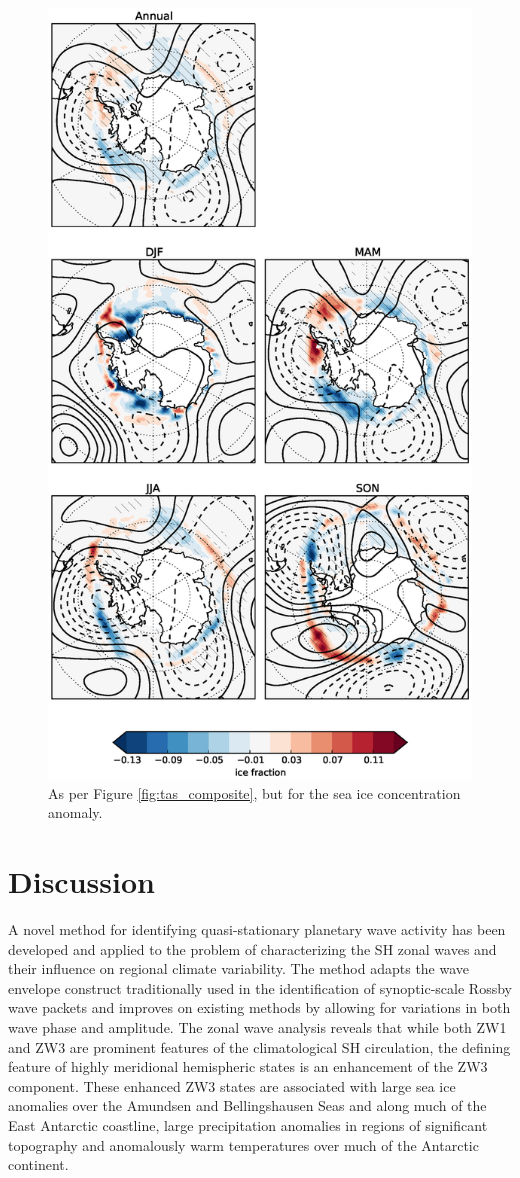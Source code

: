 \begin{figure}
\begin{center}
\includegraphics[width=0.63\columnwidth]{figures/zonalwaves/sic-composite_pwigt90pct_ERAInterim_500hPa_030day-runmean-anom-wrt-all_native-shextropics15.eps}
\caption{\label{fig:sic_composite}
As per Figure \ref{fig:tas_composite}, but for the sea ice concentration anomaly.}
\end{center}
\end{figure} 
 

\section{Discussion}


A novel method for identifying quasi-stationary planetary wave activity has been developed and applied to the problem of characterizing the SH zonal waves and their influence on regional climate variability. The method adapts the wave envelope construct traditionally used in the identification of synoptic-scale Rossby wave packets and improves on existing methods by allowing for variations in both wave phase and amplitude. The zonal wave analysis reveals that while both ZW1 and ZW3 are prominent features of the climatological SH circulation, the defining feature of highly meridional hemispheric states is an enhancement of the ZW3 component. These enhanced ZW3 states are associated with large sea ice anomalies over the Amundsen and Bellingshausen Seas and along much of the East Antarctic coastline, large precipitation anomalies in regions of significant topography and anomalously warm temperatures over much of the Antarctic continent. 

